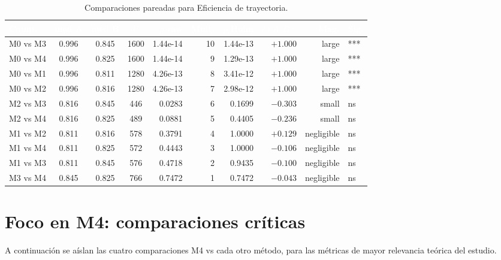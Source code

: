 \documentclass[12pt,a4paper,oneside]{book}
\begin{document}
\begin{table}[H]
\centering
\small
\caption{Comparaciones pareadas para Eficiencia de trayectoria.}
\renewcommand{\arraystretch}{1.15}
\begin{tabular}{lcccrrrrrl}
\toprule
\rowcolor{primary}
\textcolor{white}{\textbf{Comp.}} & \textcolor{white}{\textbf{med A}} & \textcolor{white}{\textbf{med B}} & \textcolor{white}{\textbf{$U$}} & \textcolor{white}{\textbf{$p$ raw}} & \textcolor{white}{\textbf{Mult.}} & \textcolor{white}{\textbf{$p$ Holm}} & \textcolor{white}{\textbf{$\delta(A,B)$}} & \textcolor{white}{\textbf{Mag.}} & \textcolor{white}{\textbf{Sig.}} \\
\midrule
M0 vs M3 & 0.996 & 0.845 & 1600 & 1.44e-14 & 10 & 1.44e-13 & $+1.000$ & large & *** \\
M0 vs M4 & 0.996 & 0.825 & 1600 & 1.44e-14 & 9 & 1.29e-13 & $+1.000$ & large & *** \\
M0 vs M1 & 0.996 & 0.811 & 1280 & 4.26e-13 & 8 & 3.41e-12 & $+1.000$ & large & *** \\
M0 vs M2 & 0.996 & 0.816 & 1280 & 4.26e-13 & 7 & 2.98e-12 & $+1.000$ & large & *** \\
M2 vs M3 & 0.816 & 0.845 & 446 & 0.0283 & 6 & 0.1699 & $-0.303$ & small & ns \\
M2 vs M4 & 0.816 & 0.825 & 489 & 0.0881 & 5 & 0.4405 & $-0.236$ & small & ns \\
M1 vs M2 & 0.811 & 0.816 & 578 & 0.3791 & 4 & 1.0000 & $+0.129$ & negligible & ns \\
M1 vs M4 & 0.811 & 0.825 & 572 & 0.4443 & 3 & 1.0000 & $-0.106$ & negligible & ns \\
M1 vs M3 & 0.811 & 0.845 & 576 & 0.4718 & 2 & 0.9435 & $-0.100$ & negligible & ns \\
M3 vs M4 & 0.845 & 0.825 & 766 & 0.7472 & 1 & 0.7472 & $-0.043$ & negligible & ns \\
\bottomrule
\end{tabular}
\end{table}

\newpage
\section{Foco en M4: comparaciones críticas}

A continuación se aíslan las cuatro comparaciones M4 vs cada otro método, para las métricas de mayor relevancia teórica del estudio.
\end{document}
